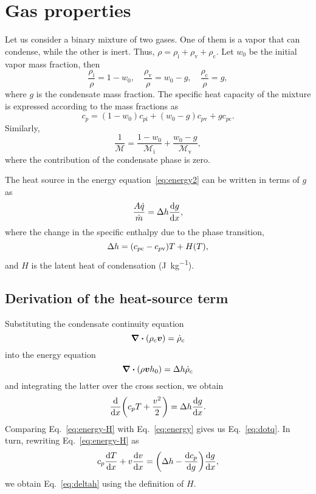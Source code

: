 \documentclass{article}
\newcommand{\vap}{\text{v}}
\newcommand{\ine}{\text{i}}
\newcommand{\con}{\text{c}}
\newcommand{\bv}{\vb*{v}}
\begin{document}
\section{Gas properties}

Let us consider a binary mixture of two gases.
One of them is a vapor that can condense, while the other is inert.
Thus, $\rho = \rho_\ine + \rho_\vap + \rho_\con$.
Let $w_0$ be the initial vapor mass fraction, then
\begin{equation}\label{eq:rhoM}
    \frac{\rho_\ine}{\rho} = 1-w_0, \quad \frac{\rho_\vap}{\rho} = w_0-g, \quad \frac{\rho_\con}{\rho} = g,
\end{equation}
where $g$ is the condensate mass fraction.
The specific heat capacity of the mixture is expressed according to the mass fractions as
\begin{equation}\label{eq:c_p}
    c_p = (1-w_0)c_{p\ine} + (w_0-g)c_{p\vap} + gc_{p\con}.
\end{equation}
Similarly,
\begin{equation}\label{eq:M}
    \frac1{\mathcal{M}} = \frac{1-w_0}{\mathcal{M}_\ine} + \frac{w_0-g}{\mathcal{M}_\vap},
\end{equation}
where the contribution of the condensate phase is zero.

The heat source in the energy equation~\eqref{eq:energy2} can be written in terms of $g$ as
\begin{equation}\label{eq:dotq}
    \frac{A\dot{q}}{\dot{m}} = \Delta{h}\dv{g}{x},
\end{equation}
where the change in the specific enthalpy due to the phase transition,
\begin{equation}\label{eq:deltah}
    \Delta{h} = \qty(c_{p\con} - c_{p\vap})T + H(T),
\end{equation}
and $H$ is the latent heat of condensation (\si{\J\per\kg}).

\subsection{Derivation of the heat-source term}

Substituting the condensate continuity equation
\begin{equation}\label{eq:rho_c}
    \div(\rho_c\bv) = \dot\rho_c
\end{equation}
into the energy equation
\begin{equation}\label{eq:h-H}
    \div(\rho\bv h_0) = \Delta{h}\dot\rho_c
\end{equation}
and integrating the latter over the cross section, we obtain
\begin{equation}\label{eq:energy-H}
    \dv{x}(c_pT + \frac{v^2}{2}) = \Delta{h}\dv{g}{x}.
\end{equation}
Comparing Eq.~\eqref{eq:energy-H} with Eq.~\eqref{eq:energy} gives us Eq.~\eqref{eq:dotq}.
In turn, rewriting Eq.~\eqref{eq:energy-H} as
\begin{equation}\label{eq:energy-H2}
    c_p\dv{T}{x} + v\dv{v}{x} = \qty(\Delta{h} - \dv{c_p}{g})\dv{g}{x},
\end{equation}
we obtain Eq.~\eqref{eq:deltah} using the definition of $H$.
\end{document}
